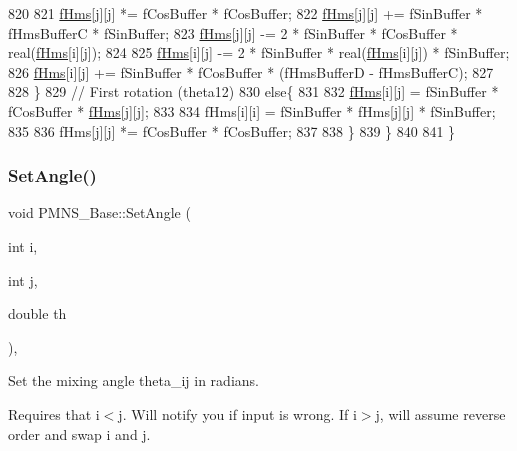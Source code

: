 \begin{DoxyCode}
820 
821       \hyperlink{classOscProb_1_1PMNS__Base_adf5901166216e8c7a5cff2092952f473}{fHms}[j][j] *= fCosBuffer * fCosBuffer;
822       \hyperlink{classOscProb_1_1PMNS__Base_adf5901166216e8c7a5cff2092952f473}{fHms}[j][j] += fSinBuffer * fHmsBufferC * fSinBuffer;
823       \hyperlink{classOscProb_1_1PMNS__Base_adf5901166216e8c7a5cff2092952f473}{fHms}[j][j] -= 2 * fSinBuffer * fCosBuffer * real(\hyperlink{classOscProb_1_1PMNS__Base_adf5901166216e8c7a5cff2092952f473}{fHms}[i][j]);
824 
825       \hyperlink{classOscProb_1_1PMNS__Base_adf5901166216e8c7a5cff2092952f473}{fHms}[i][j] -= 2 * fSinBuffer * real(\hyperlink{classOscProb_1_1PMNS__Base_adf5901166216e8c7a5cff2092952f473}{fHms}[i][j]) * fSinBuffer;
826       \hyperlink{classOscProb_1_1PMNS__Base_adf5901166216e8c7a5cff2092952f473}{fHms}[i][j] += fSinBuffer * fCosBuffer * (fHmsBufferD - fHmsBufferC);
827 
828     \}
829     \textcolor{comment}{// First rotation (theta12)}
830     \textcolor{keywordflow}{else}\{
831 
832       \hyperlink{classOscProb_1_1PMNS__Base_adf5901166216e8c7a5cff2092952f473}{fHms}[i][j] = fSinBuffer * fCosBuffer * \hyperlink{classOscProb_1_1PMNS__Base_adf5901166216e8c7a5cff2092952f473}{fHms}[j][j];
833 
834       fHms[i][i] = fSinBuffer * fHms[j][j] * fSinBuffer;
835 
836       fHms[j][j] *= fCosBuffer * fCosBuffer;
837 
838     \}
839   \}
840 
841 \}
\end{DoxyCode}
\mbox{\label{classOscProb_1_1PMNS__Base_ace7875cf6d3bec161a2b7ed2690aec34}} 
\subsubsection{\texorpdfstring{Set\+Angle()}{SetAngle()}}
{\footnotesize\ttfamily void P\+M\+N\+S\+\_\+\+Base\+::\+Set\+Angle (\begin{DoxyParamCaption}\item[{int}]{i,  }\item[{int}]{j,  }\item[{double}]{th }\end{DoxyParamCaption})\hspace{0.3cm}{\ttfamily [virtual]}, {\ttfamily [inherited]}}

Set the mixing angle theta\+\_\+ij in radians.

Requires that i$<$j. Will notify you if input is wrong. If i$>$j, will assume reverse order and swap i and j.

